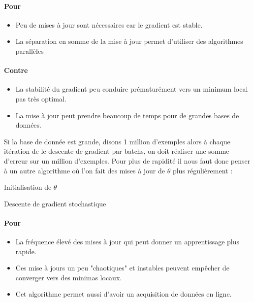 \paragraph{Pour}
\begin{itemize}
	\item Peu de mises à jour sont nécessaires car le gradient est stable.
	\item La séparation en somme de la mise à jour permet d'utiliser des algorithmes parallèles
\end{itemize}
\paragraph{Contre}
\begin{itemize}
	\item La stabilité du gradient peu conduire prématurément vers un minimum local pas très optimal.
	\item La mise à jour peut prendre beaucoup de temps pour de grandes bases de données.
\end{itemize}


Si la base de donnée est grande, disons 1 million d'exemples alors à chaque itération de le descente de gradient par batchs, on doit réaliser une somme d'erreur sur un million d'exemples. Pour plus de rapidité il nous faut donc penser à un autre algorithme où l'on fait des mises à jour de $\theta$ plus régulièrement :

\begin{center}
	\begin{algorithm}[H]
		Initialisation de $\theta$\;
		\caption{Descente de gradient stochastique}
	\end{algorithm}
\end{center}

\paragraph{Pour}
\begin{itemize}
	\item La fréquence élevé des mises à jour qui peut donner un apprentissage plus rapide.
	\item Ces mise à jours un peu "chaotiques" et instables peuvent empêcher de converger vers des minimas locaux.
	\item Cet algorithme permet aussi d'avoir un acquisition de données en ligne.
\end{itemize}
